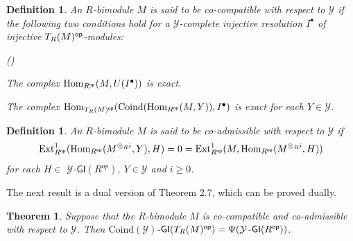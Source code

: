 \documentclass[10pt,twoside]{amsart}
\theoremstyle{bfupright head,slanted body}
\theoremstyle{bfupright head,upright body}
\theoremstyle{fixed bf head,slanted body}
\newtheorem{thm}[res]{Theorem}          \newtheorem*{thm*}{Theorem}
\newtheorem{lem}[res]{Lemma}            \newtheorem*{lem*}{Lemma}
\theoremstyle{fixed bf head,upright body}
\newtheorem{dfn}[res]{Definition}       \newtheorem*{dfn*}{Definition}
\theoremstyle{numbered paragraph}
\newlength{\thmlistleft}        %
\newlength{\thmlistright}       %
\newlength{\thmlistpartopsep}   %
\newlength{\thmlisttopsep}      %
\newlength{\thmlistparsep}      %
\newlength{\thmlistitemsep}     %
\newcounter{eqc}
\newenvironment{eqc}{\begin{list}{\upshape (\textit{\roman{eqc}})}%
    {\usecounter{eqc}%
      \setlength{\leftmargin}{\thmlistleft}%
      \setlength{\labelwidth}{\thmlistleft}%
      \setlength{\rightmargin}{\thmlistright}%
      \setlength{\partopsep}{\thmlistpartopsep}%
      \setlength{\topsep}{\thmlisttopsep}%
      \setlength{\parsep}{\thmlistparsep}%
      \setlength{\itemsep}{\thmlistitemsep}}}%
  {\end{list}}%
\newcounter{prt}
\newenvironment{prt}{\begin{list}{\upshape (\alph{prt})}%
    {\usecounter{prt}%
      \setlength{\leftmargin}{\thmlistleft}%
      \setlength{\labelwidth}{\thmlistleft}%
      \setlength{\rightmargin}{\thmlistright}%
      \setlength{\partopsep}{\thmlistpartopsep}%
      \setlength{\topsep}{\thmlisttopsep}%
      \setlength{\parsep}{\thmlistparsep}%
      \setlength{\itemsep}{\thmlistitemsep}}}%
  {\end{list}}%
\newenvironment{prf*}[1][Proof]{%
  \begin{proof}[\bf #1]
    \setcounter{equation}{0}
    \renewcommand{\theequation}{\arabic{equation}}}
  {\end{proof}
}
\numberwithin{equation}{res}
\newcommand{\GI}{\mathsf{GI}}
\newcommand{\FI}{\mathsf{FI}}
\newcommand{\Coind}{\mathrm{Coind}}
\newcommand{\Rop}{R^{\sf op}}
\newcommand{\op}{\sf op}
\newcommand{\Hom}{\operatorname{Hom}}
\newcommand{\Ext}{\operatorname{Ext}}
\begin{document}
\begin{dfn} \label{dfn of cocompatible}
An $R$-bimodule $M$ is said to be \emph{co}-\emph{compatible with respect to $\mathcal{Y}$} if
the following two conditions hold
for a $\mathcal{Y}$-complete injective resolution $I^\bullet$ of injective $T_R(M)^{\op}$-modules:
\begin{prt}
\item[(C1')] The complex $\Hom_{\Rop}(M, U(I^\bullet))$ is exact.
\item[(C2')] The complex $\Hom_{T_R(M)^{\op}}(\Coind(\Hom_{\Rop}(M, Y)), I^\bullet)$ is exact for each $Y\in\mathcal{Y}$.
\end{prt}
\end{dfn}

\begin{dfn} \label{dfn of coadmissible}
An $R$-bimodule $M$ is said to be \emph{co}-\emph{admissible with respect to $\mathcal{Y}$} if
\[
\Ext_{\Rop}^1(\Hom_{\Rop}(M^{\otimes_Ri}, Y), H)=0=\Ext_{\Rop}^1(M, \Hom_{\Rop}(M^{\otimes_Ri},H))
\]
for each $H \in$ $\mathcal{Y}$-$\GI(R^{op})$, $Y \in \mathcal{Y}$ and $i\geqslant 0$.
\end{dfn}




The next result is a dual version of Theorem 2.7, which can be proved dually.

\begin{thm} \label{THM GITRM = Psi cons}
Suppose that the $R$-bimodule $M$ is co-compatible and co-admissible with respect to $\mathcal{Y}$.
Then $\Coind(\mathcal{Y})$-$\GI(T_R(M)^{\op}) = \Psi(\mathcal{Y}$-$\GI(\Rop))$.
\end{thm}
\end{document}
